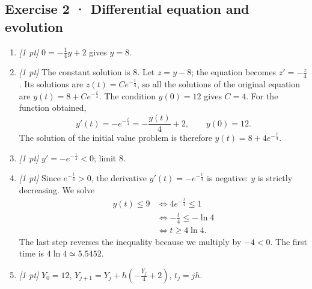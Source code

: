 \subsection*{Exercise 2 · Differential equation and evolution}\begin{enumerate}

\item \textit{[1 pt]} $0=-\frac{1}{4}y+2$ gives $y=8$.

\item \textit{[1 pt]} The constant solution is $8$. Let $z=y-8$; the equation becomes $z'=-\frac{z}{4}$. Its solutions are $z(t)=Ce^{-\frac{t}{4}}$, so all the solutions of the original equation are $y(t)=8+Ce^{-\frac{t}{4}}$.
The condition $y(0)=12$ gives $C=4$. For the function obtained,
\[y'(t)=-e^{-\frac{t}{4}}=-\frac{y(t)}{4}+2,\qquad y(0)=12.\]
The solution of the initial value problem is therefore $y(t)=8+4e^{-\frac{t}{4}}$.

\item \textit{[1 pt]} $y'=-e^{-\frac{t}{4}}<0$; limit $8$.

\item \textit{[1 pt]} Since $e^{-\frac{t}{4}}>0$, the derivative $y'(t)=-e^{-\frac{t}{4}}$ is negative: $y$ is strictly decreasing. We solve
\[\begin{aligned}y(t)\le 9&\Longleftrightarrow 4e^{-\frac{t}{4}}\le1\\&\Longleftrightarrow -\frac{t}{4}\le-\ln 4\\&\Longleftrightarrow t\ge 4\ln 4.\end{aligned}\]
The last step reverses the inequality because we multiply by $-4<0$. The first time is $4\ln 4\simeq5.5452$.

\item \textit{[1 pt]} $Y_0=12$, $Y_{j+1}=Y_j+h(-\frac{Y_j}{4}+2)$, $t_j=jh$.

\end{enumerate}

